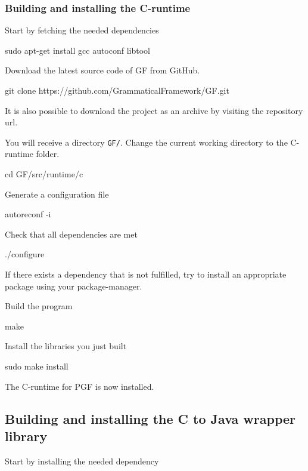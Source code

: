 \subsubsection{Building and installing the C-runtime}
Start by fetching the needed dependencies

\begin{terminal}
sudo apt-get install gcc autoconf libtool
\end{terminal}

Download the latest source code of GF from GitHub.

\begin{terminal}
git clone https://github.com/GrammaticalFramework/GF.git
\end{terminal}

It is also possible to download the project as an archive by visiting the repository url.

You will receive a directory \texttt{GF/}. Change the current working directory to the C-runtime folder.

\begin{terminal}
cd GF/src/runtime/c
\end{terminal}

Generate a configuration file

\begin{terminal}
autoreconf -i
\end{terminal}

Check that all dependencies are met

\begin{terminal}
./configure
\end{terminal}

If there exists a dependency that is not fulfilled, try to install an appropriate package using your package-manager.

Build the program

\begin{terminal}
make
\end{terminal}

Install the libraries you just built

\begin{terminal}
sudo make install
\end{terminal}

The C-runtime for PGF is now installed.

\subsection{Building and installing the C to Java wrapper library}
Start by installing the needed dependency

